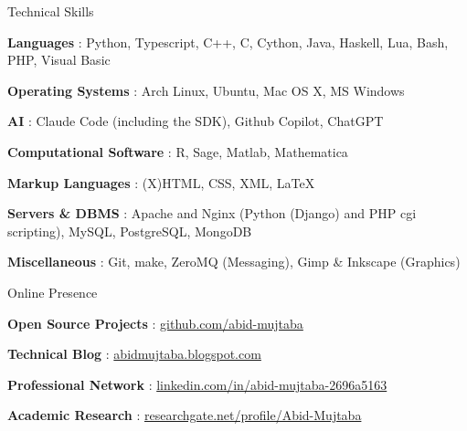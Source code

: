 \newpage


\begin{Section}{Technical Skills}

	\begin{nbList}

		\item \textbf{Languages} : Python, Typescript, C++, C, Cython, Java, Haskell, Lua, Bash, PHP, Visual Basic

		\item \textbf{Operating Systems} : Arch Linux, Ubuntu, Mac OS X, MS Windows

		\item \textbf{AI} : Claude Code (including the SDK), Github Copilot, ChatGPT

		\item \textbf{Computational Software} : R, Sage, Matlab, Mathematica

		\item \textbf{Markup Languages} : (X)HTML, CSS, XML, \LaTeX

		\item \textbf{Servers \& DBMS} : Apache and Nginx (Python (Django) and PHP cgi scripting), MySQL, PostgreSQL, MongoDB

		\item \textbf{Miscellaneous} : Git, make, ZeroMQ (Messaging), Gimp \& Inkscape (Graphics)

	\end{nbList}

\end{Section}


\begin{Section}{Online Presence}

    \begin{nbList}

    	\item \textbf{Open Source Projects} : \href{https://github.com/abid-mujtaba}{github.com/abid-mujtaba}

    	\item \textbf{Technical Blog} : \href{https://abidmujtaba.blogspot.com}{abidmujtaba.blogspot.com}

    	\item \textbf{Professional Network} : \href{https://linkedin.com/in/abid-mujtaba-2696a5163}{linkedin.com/in/abid-mujtaba-2696a5163}

		\item \textbf{Academic Research} : \href{https://researchgate.net/profile/Abid-Mujtaba}{researchgate.net/profile/Abid-Mujtaba}

    \end{nbList}

\end{Section}


